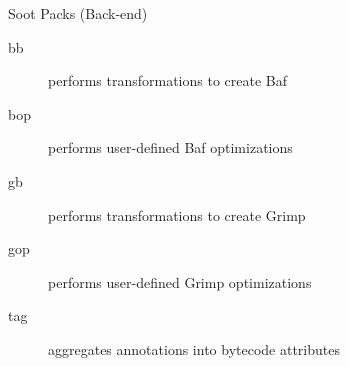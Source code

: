 \begin{slide}{Soot Packs (Back-end)}
\begin{description}
\item[bb] performs transformations to create Baf
\item[bop] performs user-defined Baf optimizations
\end{description}
\begin{description}
\item[gb] performs transformations to create Grimp
\item[gop] performs user-defined Grimp optimizations
\end{description}
\begin{description}
\item[tag] aggregates annotations into bytecode attributes
\end{description}
\end{slide}



